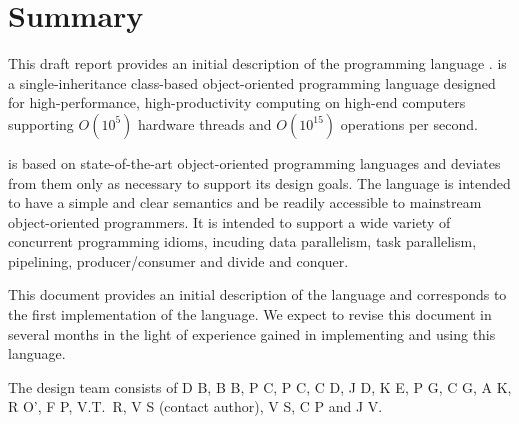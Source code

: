 
\thispagestyle{empty}




\chapter*{Summary}

This draft report provides an initial description of the programming
language \Xten. \Xten{} is a single-inheritance class-based object-oriented
programming language designed for high-performance, high-productivity
computing on high-end computers supporting $O(10^5)$ hardware threads
and $O(10^{15})$ operations per second. 

{}\Xten{} is based on state-of-the-art object-oriented programming
languages and deviates from them only as necessary to support its
design goals. The language is intended to have a simple and clear
semantics and be readily accessible to mainstream object-oriented
programmers. It is intended to support a wide variety of concurrent
programming idioms, incuding data parallelism, task parallelism,
pipelining, producer/consumer and divide and conquer.

This document provides an initial description of the language and 
corresponds to the first implementation of the language.
We expect to revise this document in several months in the light of
experience gained in implementing and using this language.

The \Xten{} design team consists of 
D B, 
B B, 
P C, 
P C, 
C D, 
J D, 
K E,
P G, 
C G, 
A K, 
R O', 
F P, 
V.T.~R, 
V S (contact author), 
V S,
C P
and 
J V.


